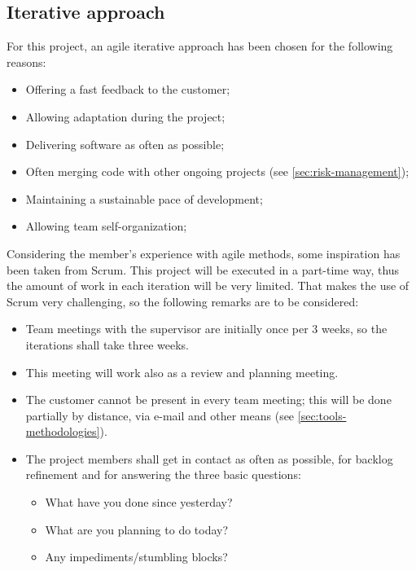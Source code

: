 \subsection{Iterative approach}
%
%
For this project, an agile iterative approach has been chosen for the following reasons:
\begin{itemize}
	\item Offering a fast feedback to the customer;
	\item Allowing adaptation during the project;
	\item Delivering software as often as possible;
	\item Often merging code with other ongoing projects (see \autoref{sec:risk-management});
	\item Maintaining a sustainable pace of development;
	\item Allowing team self-organization;
\end{itemize}
%
Considering the member's experience with agile methods, some inspiration has been taken from Scrum.
This project will be executed in a part-time way, thus the amount of work in each iteration will be very limited.
That makes the use of Scrum very challenging, so the following remarks are to be considered:
\begin{itemize}
	\item Team meetings with the supervisor are initially once per 3 weeks, so the iterations shall take three weeks.
	\item This meeting will work also as a review and planning meeting.
	\item The customer cannot be present in every team meeting; this will be done partially by distance, via e-mail and other means (see \autoref{sec:tools-methodologies}).
	\item The project members shall get in contact as often as possible, for backlog refinement and for answering the three basic questions:
		\begin{itemize}
			\item What have you done since yesterday?
			\item What are you planning to do today?
			\item Any impediments/stumbling blocks?
		\end{itemize}
\end{itemize}


